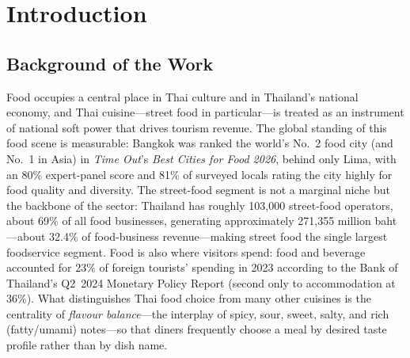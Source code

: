 %

\section{Introduction}

\subsection{Background of the Work}
Food occupies a central place in Thai culture and in Thailand's national economy,
and Thai cuisine---street food in particular---is treated as an instrument of
national soft power that drives tourism revenue. The global standing of this food
scene is measurable: Bangkok was ranked the world's No.~2 food city (and No.~1 in
Asia) in \emph{Time Out}'s \emph{Best Cities for Food 2026}, behind only Lima, with
an 80\% expert-panel score and 81\% of surveyed locals rating the city highly for
food quality and diversity. The street-food segment is not a marginal niche but the
backbone of the sector: Thailand has roughly 103{,}000 street-food operators, about
69\% of all food businesses, generating approximately 271{,}355 million baht---about
32.4\% of food-business revenue---making street food the single largest foodservice
segment. Food is also where visitors spend: food and beverage accounted for 23\% of
foreign tourists' spending in 2023 according to the Bank of Thailand's Q2~2024
Monetary Policy Report (second only to accommodation at 36\%). What distinguishes
Thai food choice from many other cuisines is the centrality of \emph{flavour
balance}---the interplay of spicy, sour, sweet, salty, and rich (fatty/umami)
notes---so that diners frequently choose a meal by desired taste profile rather than
by dish name.

